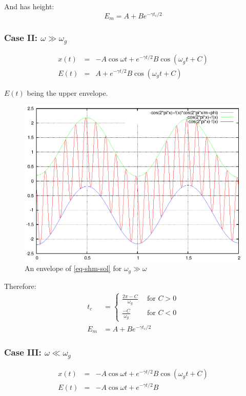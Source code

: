 \documentclass{book}
\renewcommand{\(}{\begin{columns}}
\renewcommand{\)}{\end{columns}}
\newcommand{\<}[1]{\begin{column}{#1}}
\renewcommand{\>}{\end{column}}
\begin{document}
And has height:
\begin{equation}
\label{eq-nextcolheight}
E_{m}=A+Be^{-\gamma t_c/2}
\end{equation}


\subsubsection{Case II: $\omega\gg\omega_g$}
\begin{eqnarray}
x(t)&=&-A\cos{\omega t}+e^{-\gamma t/2}B\cos{\left(\omega_g t+C\right)}\\
E(t)&=&A+e^{-\gamma t/2}B\cos{\left(\omega_g t+C\right)}
\end{eqnarray}

$E(t)$ being the upper envelope.  

\begin{figure}[!htb]
\begin{center}
\caption{An envelope of \eqref{eq-shm-sol} for $\omega_g\gg\omega$}
\includegraphics[width=0.6\columnwidth]{envelope-m-small}
\end{center}
\end{figure}

Therefore:
\begin{align}
t_c&=
\begin{cases}
\frac{2\pi-C}{\omega_g}&~~\text{for } C>0\\
\frac{-C}{\omega_g}&~~\text{for } C<0
\end{cases}\\
E_m&=A+Be^{-\gamma t_c/2}
\end{align}

\subsubsection{Case III: $\omega\ll\omega_g$}
\begin{eqnarray}
x(t)&=&-A\cos{\omega t}+e^{-\gamma t/2}B\cos{\left(\omega_g t+C\right)}\\
E(t)&=&-A\cos{\omega t}+e^{-\gamma t/2}B
\end{eqnarray}
\end{document}
